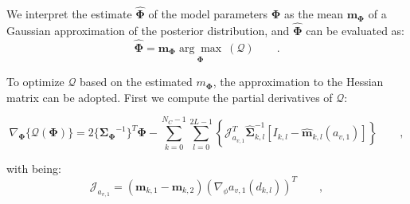 We interpret the estimate $\hat{\mathbf{\Phi}}$ of the model
parameters $\mathbf{\Phi}$ as  the mean $\mathbf{m}_{\mathbf{\Phi}}$ of a Gaussian
approximation of the posterior distribution, and
$\hat{\mathbf{\Phi}}$ can be evaluated as:
\begin{equation}
  \label{eq:maxcost}
  \hat{\mathbf{\Phi}} =
  \mathbf{m}_{\mathbf{\Phi}}\underset{\mathbf{\Phi}}{\arg\max} \
  (\mathcal{Q}) \qquad.
\end{equation}

To optimize $\mathcal{Q}$ based on the estimated $m_{\mathbf{\Phi}}$,
the approximation to the Hessian matrix can be adopted. First we
compute the partial derivatives of $\mathcal{Q}$:

\begin{equation}
\label{eq:partcost}
\nabla_{\mathbf{\Phi}}\{{\mathcal{Q}(\mathbf{\Phi})}\} =  2\{{\mathbf{\Sigma}_{\mathbf{\Phi}}}^{-1}\}^{T}{\mathbf{\Phi}} - \sum_{k = 0}^{N_{C}-1} \sum_{l=0}^{2L-1}
\left\{\mathcal{J}_{a_{v,1}}^T\hat{\mathbf{\Sigma}}_{k,l}^{-1}\left[I_{k,l}-\hat{\mathbf{m}}_{k,l}(a_{v,1})\right]\right\}\qquad,
\end{equation}

with being:
\begin{equation}
  \label{eq:jocob}
  \mathcal{J}_{a_{v,1}} = \left( \mathbf{m}_{k,1} -\mathbf{m}_{k,2} \right)(\nabla_{\phi} a_{v,1}(d_{k,l}))^T\qquad,
\end{equation}


